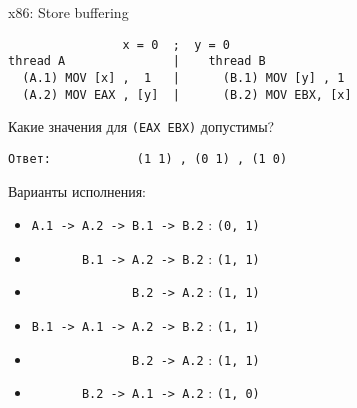 \begin{frame}{x86: Store buffering}

\begin{adjustbox}{width=\textwidth,height=2cm,keepaspectratio}
\begin{lstlisting}
                x = 0  ;  y = 0
thread A               |    thread B          
  (A.1) MOV [x] ,  1   |      (B.1) MOV [y] , 1  
  (A.2) MOV EAX , [y]  |      (B.2) MOV EBX, [x] 
\end{lstlisting}
\end{adjustbox}

Какие значения для \texttt{(EAX EBX)} допустимы?

\texttt{Ответ:\ \ \ \ \ \ \ \ \ \ \ \ (1 1)\ , (0 1)\ , (1 0)}

Варианты исполнения:
\begin{itemize}
    \item \texttt{A.1 -> A.2 -> B.1 -> B.2}                            : \texttt{(0, 1)}
    \item \texttt{\ \ \ \ \ \ \       B.1 -> A.2 -> B.2}               : \texttt{(1, 1)}
    \item \texttt{\ \ \ \ \ \ \ \ \ \ \ \ \ \              B.2 -> A.2} : \texttt{(1, 1)}
    \item \texttt{B.1 -> A.1 -> A.2 -> B.2}                            : \texttt{(1, 1)}
    \item \texttt{\ \ \ \ \ \ \ \ \ \ \ \ \ \              B.2 -> A.2} : \texttt{(1, 1)}
    \item \texttt{\ \ \ \ \ \ \       B.2 -> A.1 -> A.2}               : \texttt{(1, 0)}
\end{itemize}
\end{frame}

